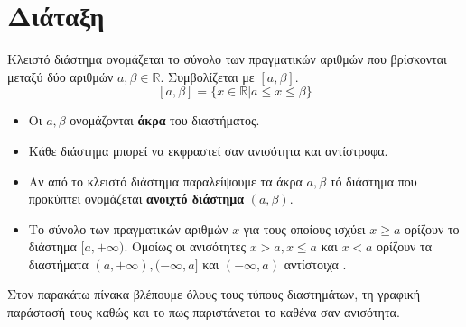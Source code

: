 \section{Διάταξη}
\Thewria
\orismoi
{}
Κλειστό διάστημα ονομάζεται το σύνολο των πραγματικών αριθμών που βρίσκονται μεταξύ δύο αριθμών $ a,\beta\in\mathbb{R} $. Συμβολίζεται με $ [a,\beta] $.
\[ [a,\beta]=\{x\in\mathbb{R}|a\leq x\leq \beta\} \]
\begin{itemize}[itemsep=0mm]
\item Οι $ a,\beta $ ονομάζονται \textbf{άκρα} του διαστήματος.
\item Κάθε διάστημα μπορεί να εκφραστεί σαν ανισότητα και αντίστροφα.
\item Αν από το κλειστό διάστημα παραλείψουμε τα άκρα $ a,\beta $ τό διάστημα που προκύπτει ονομάζεται \textbf{ανοιχτό διάστημα} $ (a,\beta) $.
\item Το σύνολο των πραγματικών αριθμών $ x $ για τους οποίους ισχύει $ x\geq a $ ορίζουν το διάστημα $ [a,+\infty) $. Ομοίως οι ανισότητες $ x>a,x\leq a $ και $ x<a $ ορίζουν τα διαστήματα $ (a,+\infty), (-\infty,a] $ και $ (-\infty,a) $ αντίστοιχα .
\end{itemize}
Στον παρακάτω πίνακα βλέπουμε όλους τους τύπους διαστημάτων, τη γραφική παράστασή τους καθώς και το πως παριστάνεται το καθένα σαν ανισότητα.
